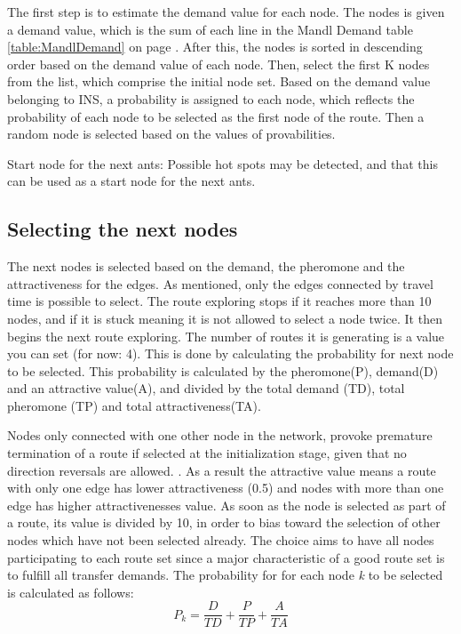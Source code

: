The first step is to estimate the demand value for each node. The nodes is given a demand value, which is the sum of each line in the Mandl Demand table \ref{table:MandlDemand} on page \pageref{table:MandlDemand}.
After this, the nodes is sorted in descending order based on the demand value of each node.
Then, select the first K nodes from the list, which comprise the initial node set. Based on the demand value belonging to INS, a probability is assigned to each node, which reflects the probability of each node to be selected as the first node of the route. Then a random node is selected based on the values of provabilities. 

Start node for the next ants: Possible hot spots may be detected, and that this can be used as a start node for the next ants. 

\subsection{Selecting the next nodes}
\begin{algorithm}[H]
\end{algorithm}

The next nodes is selected based on the demand, the pheromone and the attractiveness for the edges. As mentioned, only the edges connected by travel time is possible to select. The route exploring stops if it reaches more than 10 nodes, and if it is stuck meaning it is not allowed to select a node twice. It then begins the next route exploring. The number of routes it is generating is a value you can set (for now: 4).
This is done by calculating the probability for next node to be selected. This probability is calculated by the pheromone(P), demand(D) and an attractive value(A), and divided by the total demand (TD), total pheromone (TP) and total attractiveness(TA).

Nodes only connected with one other node in the network, provoke premature termination of a route if selected at the initialization stage, given that no direction reversals are allowed. \citep{kechagiopoulos14}. As a result the attractive value means a route with only one edge has lower attractiveness (0.5) and nodes with more than one edge has higher attractivenesses value. As soon as the node is selected as part of a route, its value is divided by 10, in order to bias toward the selection of other nodes which have not been selected already. The choice aims to have all nodes participating to each route set since a major characteristic of a good route set is to fulfill all transfer demands. %
The probability for for each node \textit{k} to be selected is calculated as follows:
$$ P_{k} = \frac{D}{TD} + \frac{P}{TP} + \frac{A}{TA}$$ 

